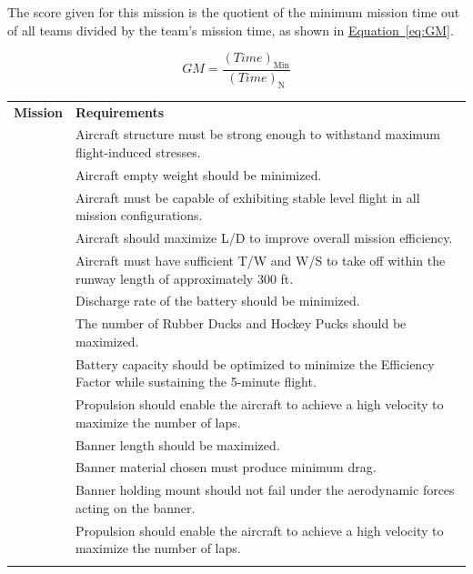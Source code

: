 \documentclass[10pt, letterpaper]{article}
\renewcommand{\arraystretch}{1.15} %
\begin{document}
The score given for this mission is the quotient of the minimum mission time out of all teams divided by the team’s mission time, as shown in \hyperref[eq:GM]{Equation~\ref*{eq:GM}}.

\begin{equation}
\label{eq:GM}
GM = \frac{(Time)_{\text{Min}}}{(Time)_{\text{N}}}
\end{equation}

\begin{table}[H] 
\centering 
\renewcommand{\arraystretch}{0.9} 
\begin{tabularx}{\textwidth}{|>{\columncolor{db}}c|>{\arraybackslash}X|} 
\hline 
\rowcolor{y}\textbf{Mission} & \textbf{Requirements} \\ \Xhline{1.5pt} %

& Aircraft structure must be strong enough to withstand maximum flight-induced stresses. \\ \cline{2-2} 
& Aircraft empty weight should be minimized. \\ \cline{2-2} 
& Aircraft must be capable of exhibiting stable level flight in all mission configurations. \\ \cline{2-2} 
& Aircraft should maximize L/D to improve overall mission efficiency. \\ \cline{2-2} 
& Aircraft must have sufficient T/W and W/S to take off within the runway length of approximately 300 ft. \\ \cline{2-2} 
\multirow{-7}{*}{\textcolor{gray!5}{M1, M2, M3}} & Discharge rate of the battery should be minimized. \\ \Xhline{1.5pt} %

& The number of Rubber Ducks and Hockey Pucks should be maximized. \\ \cline{2-2} 
& Battery capacity should be optimized to minimize the Efficiency Factor while sustaining the 5-minute flight. \\ \cline{2-2} 
\multirow{-3}{*}{\textcolor{gray!5}{M2}} & Propulsion should enable the aircraft to achieve a high velocity to maximize the number of laps. \\ \Xhline{1.5pt} %

& Banner length should be maximized. \\ \cline{2-2} 
& Banner material chosen must produce minimum drag. \\ \cline{2-2} 
& Banner holding mount should not fail under the aerodynamic forces acting on the banner. \\ \cline{2-2} 
\multirow{-4}{*}{\textcolor{gray!5}{M3}} & Propulsion should enable the aircraft to achieve a high velocity to maximize the number of laps. \\ \Xhline{1.5pt} %


\end{tabularx}
\end{table}
\end{document}
